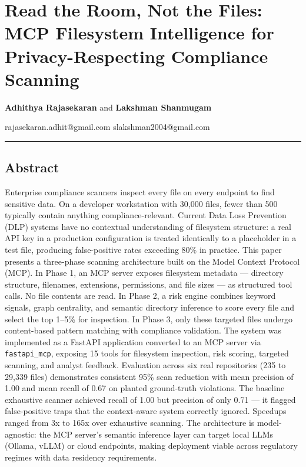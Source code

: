 \documentclass[
]{article}
\author{}
\date{}
\begin{document}
\section{Read the Room, Not the Files: MCP Filesystem Intelligence for
Privacy-Respecting Compliance
Scanning}\label{read-the-room-not-the-files-mcp-filesystem-intelligence-for-privacy-respecting-compliance-scanning}

\textbf{Adhithya Rajasekaran} and \textbf{Lakshman Shanmugam}

rajasekaran.adhit@gmail.com \textbar{} slakshman2004@gmail.com

\begin{center}\rule{0.5\linewidth}{0.5pt}\end{center}

\subsection{Abstract}\label{abstract}

Enterprise compliance scanners inspect every file on every endpoint to
find sensitive data. On a developer workstation with 30,000 files, fewer
than 500 typically contain anything compliance-relevant. Current Data
Loss Prevention (DLP) systems have no contextual understanding of
filesystem structure: a real API key in a production configuration is
treated identically to a placeholder in a test file, producing
false-positive rates exceeding 80\% in practice. This paper presents a
three-phase scanning architecture built on the Model Context Protocol
(MCP). In Phase 1, an MCP server exposes filesystem metadata ---
directory structure, filenames, extensions, permissions, and file sizes
--- as structured tool calls. No file contents are read. In Phase 2, a
risk engine combines keyword signals, graph centrality, and semantic
directory inference to score every file and select the top 1--5\% for
inspection. In Phase 3, only these targeted files undergo content-based
pattern matching with compliance validation. The system was implemented
as a FastAPI application converted to an MCP server via
\texttt{fastapi\_mcp}, exposing 15 tools for filesystem inspection, risk
scoring, targeted scanning, and analyst feedback. Evaluation across six
real repositories (235 to 29,339 files) demonstrates consistent 95\%
scan reduction with mean precision of 1.00 and mean recall of 0.67 on
planted ground-truth violations. The baseline exhaustive scanner
achieved recall of 1.00 but precision of only 0.71 --- it flagged
false-positive traps that the context-aware system correctly ignored.
Speedups ranged from 3x to 165x over exhaustive scanning. The
architecture is model-agnostic: the MCP server's semantic inference
layer can target local LLMs (Ollama, vLLM) or cloud endpoints, making
deployment viable across regulatory regimes with data residency
requirements.
\end{document}
